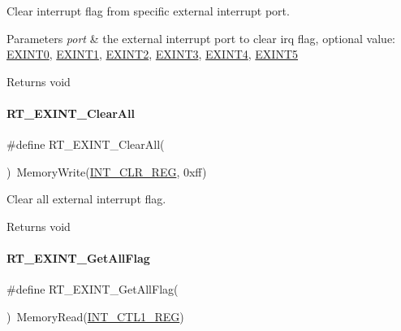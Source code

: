 Clear interrupt flag from specific external interrupt port. 


\begin{DoxyParams}{Parameters}
{\em port} & the external interrupt port to clear irq flag, optional value\+: \mbox{\hyperlink{a00011_a2e3f727d359d26314631842394f4a223}{E\+X\+I\+N\+T0}}, \mbox{\hyperlink{a00011_a1ea7d6796165b98f1bc6bf6fe841c3d9}{E\+X\+I\+N\+T1}}, \mbox{\hyperlink{a00011_ac959f4d8aed4e04e25c966e6c8315431}{E\+X\+I\+N\+T2}}, \mbox{\hyperlink{a00011_ae8428c0cbd7362b90ea048bcf59aef2c}{E\+X\+I\+N\+T3}}, \mbox{\hyperlink{a00011_a719b5fa27b5469e1fe2844e9930fa249}{E\+X\+I\+N\+T4}}, \mbox{\hyperlink{a00011_a309fb21107f9f6261cd7e7ca9de6c2f2}{E\+X\+I\+N\+T5}} \\
\hline
\end{DoxyParams}
\begin{DoxyReturn}{Returns}
void 
\end{DoxyReturn}
\mbox{\label{a00011_a4f2cc857d9a0da5f06bbf5ff62babbdb}} 
\paragraph{\texorpdfstring{R\+T\+\_\+\+E\+X\+I\+N\+T\+\_\+\+Clear\+All}{RT\_EXINT\_ClearAll}}
{\footnotesize\ttfamily \#define R\+T\+\_\+\+E\+X\+I\+N\+T\+\_\+\+Clear\+All(\begin{DoxyParamCaption}{ }\end{DoxyParamCaption})~Memory\+Write(\mbox{\hyperlink{a00020_a3db4a185cd2de3411b6de2dfee71a009}{I\+N\+T\+\_\+\+C\+L\+R\+\_\+\+R\+EG}}, 0xff)}



Clear all external interrupt flag. 

\begin{DoxyReturn}{Returns}
void 
\end{DoxyReturn}
\mbox{\label{a00011_ab8287fc872a2d0ae785c8b3b51a37a5e}} 
\paragraph{\texorpdfstring{R\+T\+\_\+\+E\+X\+I\+N\+T\+\_\+\+Get\+All\+Flag}{RT\_EXINT\_GetAllFlag}}
{\footnotesize\ttfamily \#define R\+T\+\_\+\+E\+X\+I\+N\+T\+\_\+\+Get\+All\+Flag(\begin{DoxyParamCaption}{ }\end{DoxyParamCaption})~Memory\+Read(\mbox{\hyperlink{a00020_a854bd396a90c4c6b4415c106cb64281f}{I\+N\+T\+\_\+\+C\+T\+L1\+\_\+\+R\+EG}})}



